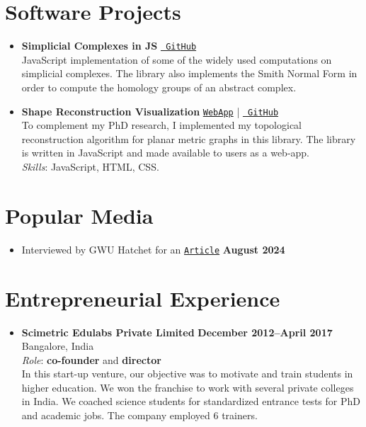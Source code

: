 \documentclass[11pt]{article}
\begin{document}
\section{Software Projects}
\begin{itemize}[leftmargin=*]
  \item \textbf{Simplicial Complexes in JS}
  \hfill\href{https://github.com/tdajs/simplicial-complex}{\footnotesize \tt
    GitHub}\\ 
JavaScript implementation of some of the widely used computations on simplicial
complexes. The library also implements the Smith Normal Form in order to compute
the homology groups of an abstract complex.
  
\item \textbf{Shape Reconstruction Visualization}
\hfill \href{https://smajhi.com/shape-reconstruction}{\footnotesize \tt WebApp}
| \href{https://github.com/sushovan4/shape-reconstruction}{\footnotesize \tt
    GitHub}\\ To complement my PhD research, I implemented my topological
  reconstruction algorithm for planar metric graphs in this library.  The
  library is written in JavaScript and made available to users as a
  web-app.\\ \emph{Skills}: JavaScript, HTML, CSS.
\end{itemize}

\section{Popular Media}
\begin{itemize}[leftmargin=*]
\item Interviewed by GWU Hatchet for an  
  \href{https://gwhatchet.com/2024/08/19/new-kids-on-the-block-first-year-professors-dish-on-joining-the-ranks-at-gw/}{\tt Article}
    \hfill \textbf{\footnotesize August 2024}
\end{itemize}


\section{Entrepreneurial Experience}
\begin{itemize}[leftmargin=*]
\item \textbf{Scimetric Edulabs Private Limited}
  \hfill \textbf{\footnotesize December 2012--April 2017}\\ Bangalore,
  India\\ \emph{Role}: \textbf{co-founder} and \textbf{director}\\ In this
  start-up venture, our objective was to motivate and train students in higher
  education. We won the franchise to work with several private colleges in India. We
  coached science students for standardized entrance tests for PhD and academic
  jobs. The company employed 6 trainers.
\end{itemize}
\end{document}

